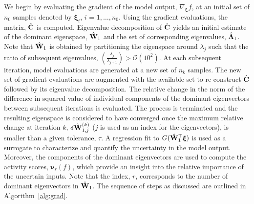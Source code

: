 We begin by evaluating the gradient of the model output, $\nabla_{\bm{\xi}}f$,
at an initial set of $n_0$ samples denoted by $\bm{\xi}_i$, $i$ = $1,\ldots,n_0$.
Using the gradient
evaluations, the matrix, $\hat{\mathbf{{C}}}$ is computed. Eigenvalue decomposition
of $\hat{\mathbf{{C}}}$ yields an initial estimate of the dominant eigenspace,
$\hat{\mathbf{{W}}}_1$ and the set of corresponding eigenvalues, 
$\hat{\mathbf{{\Lambda}}}_1$. Note that $\hat{\mathbf{{W}}}_1$ is obtained by
partitioning the eigenspace around $\lambda_j$ such that the ratio of
subsequent eigenvalues,
$\left(\frac{\lambda_j}{\lambda_{j+1}}\right)>\mathcal{O}(10^2)$.
 At each subsequent iteration, model evaluations are
generated at a new set of $n_k$ samples. The new set of gradient evaluations
are augmented with the available set to re-construct $\hat{\mathbf{{C}}}$ followed
by its eigenvalue decomposition. The relative change in the norm of the
difference in squared value of individual components of the dominant
eigenvectors between subsequent iterations is evaluated. The process is
terminated and the resulting eigenspace is considered to have converged once
the maximum relative change at iteration $k$, $\delta \hat{\mathbf{{W}}}_{1,j}^{(k)}$
($j$ is used as an index for the eigenvectors),
is smaller than a given tolerance, $\tau$.  A regression fit to
$G(\hat{\mathbf{{W}}}_1^\top\bm{\xi})$ is used as a surrogate to characterize and
quantify the uncertainty in the model output. Moreover, the components of the
dominant eigenvectors are used to compute the activity scores, $\bm{\nu}_r(f)$,
which provide an insight into the relative importance of the uncertain inputs.
Note that the index, $r$, corresponds to the number of dominant eigenvectors in
$\hat{\mathbf{{W}}}_1$. The sequence of steps as discussed are outlined
in Algorithm~\ref{alg:grad}.


